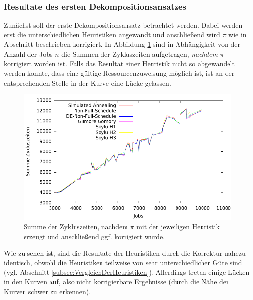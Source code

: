 \documentclass{scrreprt}
\begin{document}
\subsubsection{Resultate des ersten Dekompositionsansatzes}
\label{subsubsec:ResultateDKA1}
Zunächst soll der erste Dekompositionsansatz betrachtet werden.
Dabei werden erst die unterschiedlichen Heuristiken angewandt und anschließend wird $\pi$ wie in Abschnitt \label{sec:UnzulaessigeReihenfolgen} beschrieben korrigiert.
In Abbildung \ref{abb:kbplot} sind in Abhängigkeit von der Anzahl der Jobs $n$ die Summen der Zykluszeiten aufgetragen, \textit{nachdem} $\pi$ korrigiert worden ist.
Falls das Resultat einer Heuristik nicht so abgewandelt werden konnte, dass eine gültige Ressourcenzuweisung möglich ist, 
ist an der entsprechenden Stelle in der Kurve eine Lücke gelassen.
\begin{figure}
    \begin{center}
        \includegraphics[width=.8\textwidth]{../prog/heuristics/plots/kbplot.pdf}
    \end{center}
    \caption{
        \label{abb:kbplot}
        Summe der Zykluszeiten, nachdem $\pi$ mit der jeweiligen Heuristik erzeugt und anschließend ggf. korrigiert wurde.
    }
\end{figure}
Wie zu sehen ist, sind die Resultate der Heuristiken durch die Korrektur nahezu identisch, obwohl die Heuristiken teilweise von sehr unterschiedlicher Güte sind
(vgl. Abschnitt \ref{subsec:VergleichDerHeuristiken}).
Allerdings treten einige Lücken in den Kurven auf, also nicht korrigierbare Ergebnisse (durch die Nähe der Kurven schwer zu erkennen).
\end{document}
